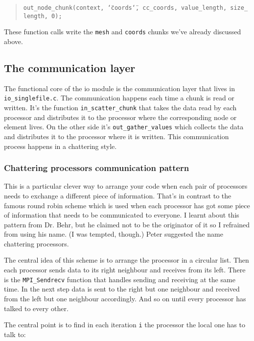 \begin{quote}
\texttt{out{\_}node{\_}chunk(context,~\char`\"{}coords\char`\"{},~cc{\_}coords,~value{\_}length,~size{\_}length,~0); }
\end{quote}
These function calls write the \texttt{mesh} and \texttt{coords} chunks
we've already discussed above.


\subsection{The communication layer}

The functional core of the io module is the communication layer that
lives in \texttt{io{\_}singlefile.c}. The communication happens
each time a chunk is read or written. It's the function \texttt{in{\_}scatter{\_}chunk}
that takes the data read by each processor and distributes it to the
processor where the corresponding node or element lives. On the other
side it's \texttt{out{\_}gather{\_}values} which collects the
data and distributes it to the processor where it is written. This
communication process happens in a chattering style.


\subsubsection{Chattering processors communication pattern}

This is a particular clever way to arrange your code when each pair
of processors needs to exchange a different piece of information.
That's in contrast to the famous round robin scheme which is used
when each processor has got some piece of information that needs to
be communicated to everyone. I learnt about this pattern from Dr.
Behr, but he claimed not to be the originator of it so I refrained
from using his name. (I was tempted, though.) Peter suggested the
name chattering processors.

The central idea of this scheme is to arrange the processor in a circular
list. Then each processor sends data to its right neighbour and receives
from its left. There is the \texttt{MPI{\_}Sendrecv} function that
handles sending and receiving at the same time. In the next step data
is sent to the right but one neighbour and received from the left
but one neighbour accordingly. And so on until every processor has
talked to every other.

The central point is to find in each iteration \texttt{i} the processor
the local one has to talk to: 

